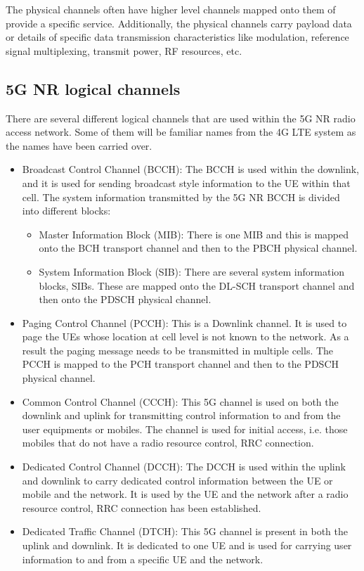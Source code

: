 The physical channels often have higher level channels mapped onto them of provide a specific service. Additionally, the physical channels carry payload data or details of specific data transmission characteristics like modulation, reference signal multiplexing, transmit power, RF resources, etc.

\subsection{5G NR logical channels}
There are several different logical channels that are used within the 5G NR radio access network. Some of them will be familiar names from the 4G LTE system as the names have been carried over.
\begin{itemize}
    \item Broadcast Control Channel (BCCH): The BCCH is used within the downlink, and it is used for sending broadcast style information to the UE within that cell. The system information transmitted by the 5G NR BCCH is divided into different blocks:
    \begin{itemize}
        \item Master Information Block (MIB): There is one MIB and this is mapped onto the BCH transport channel and then to the PBCH physical channel.
        \item System Information Block (SIB): There are several system information blocks, SIBs. These are mapped onto the DL-SCH transport channel and then onto the PDSCH physical channel.
    \end{itemize}
    \item Paging Control Channel (PCCH): This is a Downlink channel. It is used to page the UEs whose location at cell level is not known to the network. As a result the paging message needs to be transmitted in multiple cells. The PCCH is mapped to the PCH transport channel and then to the PDSCH physical channel.
    \item Common Control Channel (CCCH): This 5G channel is used on both the downlink and uplink for transmitting control information to and from the user equipments or mobiles. The channel is used for initial access, i.e. those mobiles that do not have a radio resource control, RRC connection.
    \item Dedicated Control Channel (DCCH): The DCCH is used within the uplink and downlink to carry dedicated control information between the UE or mobile and the network. It is used by the UE and the network after a radio resource control, RRC connection has been established.
    \item Dedicated Traffic Channel (DTCH): This 5G channel is present in both the uplink and downlink. It is dedicated to one UE and is used for carrying user information to and from a specific UE and the network.
\end{itemize}

